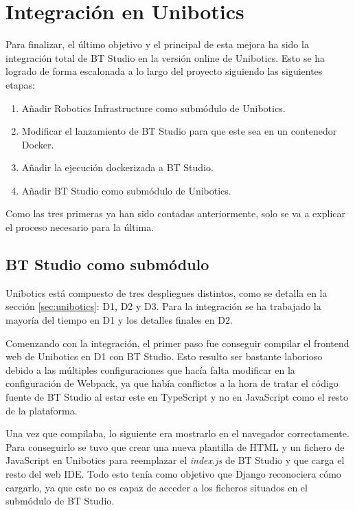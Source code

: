 \section{Integración en Unibotics}\label{sec:bt-unib}

Para finalizar, el último objetivo y el principal de esta mejora ha sido la integración total de BT Studio en la versión online de Unibotics. Esto se ha logrado de forma escalonada a lo largo del proyecto siguiendo las siguientes etapas:

\begin{enumerate}
    \item Añadir Robotics Infrastructure como submódulo de Unibotics.
    \item Modificar el lanzamiento de BT Studio para que este sea en un contenedor Docker.
    \item Añadir la ejecución dockerizada a BT Studio.
    \item Añadir BT Studio como submódulo de Unibotics.
\end{enumerate}

Como las tres primeras ya han sido contadas anteriormente, solo se va a explicar el proceso necesario para la última.

\subsection{BT Studio como submódulo}

Unibotics está compuesto de tres despliegues distintos, como se detalla en la sección \ref{sec:unibotics}: D1, D2 y D3. Para la integración se ha trabajado la mayoría del tiempo en D1 y los detalles finales en D2.

Comenzando con la integración, el primer paso fue conseguir compilar el frontend web de Unibotics en D1 con BT Studio. Esto resulto ser bastante laborioso debido a las múltiples configuraciones que hacía falta modificar en la configuración de Webpack, ya que había conflictos a la hora de tratar el código fuente de BT Studio al estar este en TypeScript y no en JavaScript como el resto de la plataforma.

Una vez que compilaba, lo siguiente era mostrarlo en el navegador correctamente. Para conseguirlo se tuvo que crear una nueva plantilla de HTML y un fichero de JavaScript en Unibotics para reemplazar el \textit{index.js} de BT Studio y que carga el resto del web IDE. Todo esto tenía como objetivo que Django reconociera cómo cargarlo, ya que este no es capaz de acceder a los ficheros situados en el submódulo de BT Studio. 

